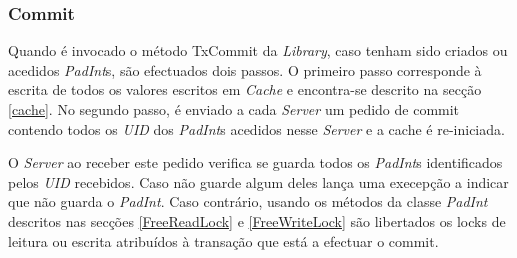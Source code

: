 \subsubsection{Commit}
\label{commit}

Quando é invocado o método TxCommit da \textit{Library}, caso tenham sido criados ou acedidos \textit{PadInt}s, são efectuados dois passos. O primeiro passo corresponde à escrita de todos os valores escritos em \textit{Cache} e encontra-se descrito na secção \ref{cache}. No segundo passo, é enviado a cada \textit{Server} um pedido de commit contendo todos os \textit{UID} dos \textit{PadInt}s acedidos nesse \textit{Server} e a cache é re-iniciada.

O \textit{Server} ao receber este pedido verifica se guarda todos os \textit{PadInt}s identificados pelos \textit{UID} recebidos. Caso não guarde algum deles lança uma execepção a indicar que não guarda o \textit{PadInt}. Caso contrário, usando os métodos da classe \textit{PadInt} descritos nas secções \ref{FreeReadLock} e \ref{FreeWriteLock} são libertados os locks de leitura ou escrita atribuídos à transação que está a efectuar o commit.